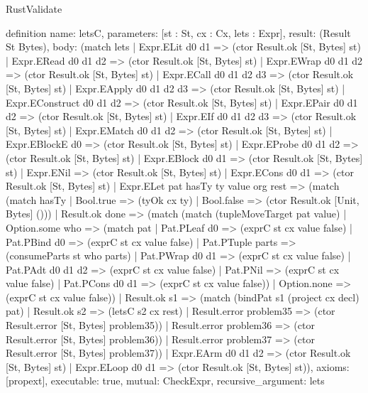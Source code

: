 \begin{lexlean}{RustValidate}
\begin{semanticmodule}
definition{
  name: letsC,
  parameters: [st : St, cx : Cx, lets : Expr],
  result: (Result St Bytes),
  body: (match lets
    | Expr.ELit d0 d1 => (ctor Result.ok [St, Bytes] st)
    | Expr.ERead d0 d1 d2 => (ctor Result.ok [St, Bytes] st)
    | Expr.EWrap d0 d1 d2 => (ctor Result.ok [St, Bytes] st)
    | Expr.ECall d0 d1 d2 d3 => (ctor Result.ok [St, Bytes] st)
    | Expr.EApply d0 d1 d2 d3 => (ctor Result.ok [St, Bytes] st)
    | Expr.EConstruct d0 d1 d2 => (ctor Result.ok [St, Bytes] st)
    | Expr.EPair d0 d1 d2 => (ctor Result.ok [St, Bytes] st)
    | Expr.EIf d0 d1 d2 d3 => (ctor Result.ok [St, Bytes] st)
    | Expr.EMatch d0 d1 d2 => (ctor Result.ok [St, Bytes] st)
    | Expr.EBlockE d0 => (ctor Result.ok [St, Bytes] st)
    | Expr.EProbe d0 d1 d2 => (ctor Result.ok [St, Bytes] st)
    | Expr.EBlock d0 d1 => (ctor Result.ok [St, Bytes] st)
    | Expr.ENil => (ctor Result.ok [St, Bytes] st)
    | Expr.ECons d0 d1 => (ctor Result.ok [St, Bytes] st)
    | Expr.ELet pat hasTy ty value org rest => (match (match hasTy
        | Bool.true => (tyOk cx ty)
        | Bool.false => (ctor Result.ok [Unit, Bytes] ()))
      | Result.ok done => (match (match (tupleMoveTarget pat value)
          | Option.some who => (match pat
            | Pat.PLeaf d0 => (exprC st cx value false)
            | Pat.PBind d0 => (exprC st cx value false)
            | Pat.PTuple parts => (consumeParts st who parts)
            | Pat.PWrap d0 d1 => (exprC st cx value false)
            | Pat.PAdt d0 d1 d2 => (exprC st cx value false)
            | Pat.PNil => (exprC st cx value false)
            | Pat.PCons d0 d1 => (exprC st cx value false))
          | Option.none => (exprC st cx value false))
        | Result.ok s1 => (match (bindPat s1 (project cx decl) pat)
          | Result.ok s2 => (letsC s2 cx rest)
          | Result.error problem35 => (ctor Result.error [St, Bytes] problem35))
        | Result.error problem36 => (ctor Result.error [St, Bytes] problem36))
      | Result.error problem37 => (ctor Result.error [St, Bytes] problem37))
    | Expr.EArm d0 d1 d2 => (ctor Result.ok [St, Bytes] st)
    | Expr.ELoop d0 d1 => (ctor Result.ok [St, Bytes] st)),
  axioms: [propext],
  executable: true,
  mutual: CheckExpr,
  recursive_argument: lets
}


\end{semanticmodule}
\end{lexlean}
